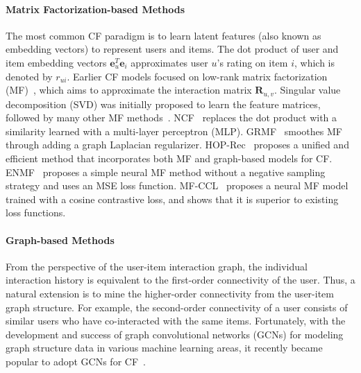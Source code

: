 \documentclass[sigconf,natbib=true]{acmart}
\begin{document}
\paragraph{Matrix Factorization-based Methods} 
The most common CF paradigm is to learn latent features (also known as embedding vectors) to represent users and items. The dot product of user and item embedding vectors $\bm{e}_u^T\bm{e}_i$ approximates user $u$’s rating on item $i$, which is denoted by $r_{ui}$. Earlier CF models focused on low-rank matrix factorization (MF)~\cite{koren2009MF}, which aims to approximate the interaction matrix $\bm{R}_{u,v}$. Singular value decomposition (SVD) was initially proposed to learn the feature matrices, followed by many other MF methods~\cite{Mnih2007PMF,rendle2009BPR,Rao2015GRMF,He2017NCF,Yi2018LRML,yang2018hop,chen2020ENMF}. NCF~\cite{He2017NCF} replaces the dot product with a similarity learned with a multi-layer perceptron (MLP). GRMF~\cite{Rao2015GRMF} smoothes MF through adding a graph Laplacian regularizer. HOP-Rec~\cite{yang2018hop} proposes a unified and efficient method that incorporates both MF and graph-based models for CF. ENMF~\cite{chen2020ENMF} proposes a simple neural MF method without a negative sampling strategy and uses an MSE loss function. MF-CCL~\cite{mao2021simplex} proposes a neural MF model trained with a cosine contrastive loss, and shows that it is superior to existing loss functions.





\paragraph{Graph-based Methods} From the perspective of the user-item interaction graph, the individual interaction history is equivalent to the first-order connectivity of the user. Thus, a natural extension is to mine the higher-order connectivity from the user-item graph structure. For example, the second-order connectivity of a user consists of similar users who have co-interacted with the same items. Fortunately, with the development and success of graph convolutional networks (GCNs) for modeling graph structure data in various machine learning areas, it recently became popular to adopt GCNs for CF~\cite{Wang19NGCF,chen20LRGCCF,He20LightGCN,Rianne2017GCMC,Rex2018pinsage,choi2021ltocf,Shen21GFCF,sun2020NIA-GCN,Mao21UltraGCN}.
\end{document}
